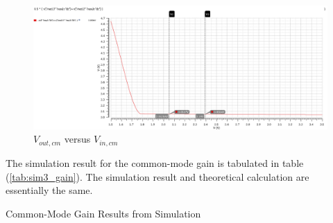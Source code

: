 \FloatBarrier

\begin{figure}[h!]
	\centering
	\includegraphics[scale=0.75]{../images/sim3.PNG}
	\caption{$V_{out,cm}$ versus $V_{in,cm}$}
	\label{fig:sim3}
\end{figure}

\FloatBarrier

The simulation result for the common-mode gain is tabulated in table (\ref{tab:sim3_gain}).
The simulation result and theoretical calculation are essentially the same.

\FloatBarrier

\begin{table}[h!]
	\centering
	\caption{Common-Mode Gain Results from Simulation}
	\label{tab:sim3_gain}
\end{table}

\FloatBarrier
